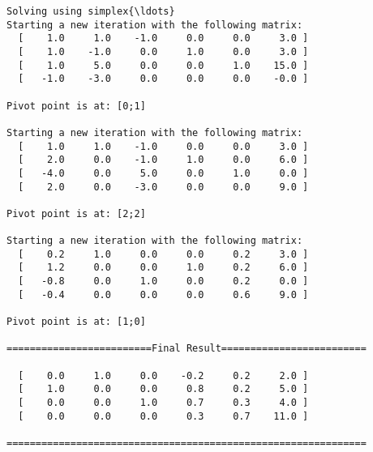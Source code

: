 \documentclass[11pt]{article}
\begin{document}
    \begin{Verbatim}[commandchars=\\\{\}]
Solving using simplex{\ldots}
Starting a new iteration with the following matrix:
  [    1.0     1.0    -1.0     0.0     0.0     3.0 ]
  [    1.0    -1.0     0.0     1.0     0.0     3.0 ]
  [    1.0     5.0     0.0     0.0     1.0    15.0 ]
  [   -1.0    -3.0     0.0     0.0     0.0    -0.0 ]

Pivot point is at: [0;1]

Starting a new iteration with the following matrix:
  [    1.0     1.0    -1.0     0.0     0.0     3.0 ]
  [    2.0     0.0    -1.0     1.0     0.0     6.0 ]
  [   -4.0     0.0     5.0     0.0     1.0     0.0 ]
  [    2.0     0.0    -3.0     0.0     0.0     9.0 ]

Pivot point is at: [2;2]

Starting a new iteration with the following matrix:
  [    0.2     1.0     0.0     0.0     0.2     3.0 ]
  [    1.2     0.0     0.0     1.0     0.2     6.0 ]
  [   -0.8     0.0     1.0     0.0     0.2     0.0 ]
  [   -0.4     0.0     0.0     0.0     0.6     9.0 ]

Pivot point is at: [1;0]

=========================Final Result=========================

  [    0.0     1.0     0.0    -0.2     0.2     2.0 ]
  [    1.0     0.0     0.0     0.8     0.2     5.0 ]
  [    0.0     0.0     1.0     0.7     0.3     4.0 ]
  [    0.0     0.0     0.0     0.3     0.7    11.0 ]

==============================================================
    \end{Verbatim}


    
    
    
\end{document}
